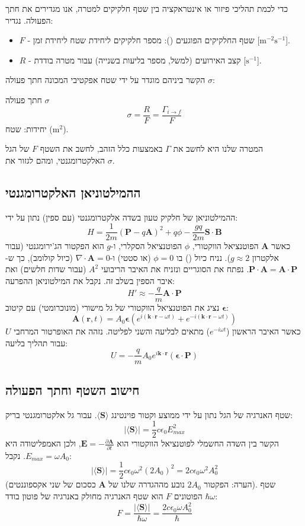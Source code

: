 כדי לכמת תהליכי פיזור או אינטראקציה בין שטף חלקיקים למטרה, אנו מגדירים את חתך הפעולה.
נגדיר:
\begin{itemize}
    \item $F$ - שטף החלקיקים הפוגעים (): מספר חלקיקים ליחידת שטח ליחידת זמן [$\text{m}^{-2}\text{s}^{-1}$].
    \item $R$ - קצב האירועים (למשל, מספר בליעות בשנייה) עבור מטרה בודדת [$\text{s}^{-1}$].
\end{itemize}

הקשר ביניהם מוגדר על ידי שטח אפקטיבי המכונה חתך פעולה $\sigma$:
\begin{definitionbox}{חתך פעולה $\sigma$}
\[
\sigma = \frac{R}{F} = \frac{\Gamma_{i \to f}}{F}
\]
יחידות: שטח ($\text{m}^2$).
\end{definitionbox}
המטרה שלנו היא לחשב את $\Gamma$ באמצעות כלל הזהב, לחשב את השטף $F$ של הגל האלקטרומגנטי, ומהם לגזור את $\sigma$.

\subsection{ההמילטוניאן האלקטרומגנטי}

ההמילטוניאן של חלקיק טעון בשדה אלקטרומגנטי (עם ספין) נתון על ידי:
\[
H = \frac{1}{2m}(\mathbf{P} - q\mathbf{A})^2 + q\phi - \frac{g q}{2m} \mathbf{S} \cdot \mathbf{B}
\]
כאשר $\mathbf{A}$ הפוטנציאל הווקטורי, $\phi$ הפוטנציאל הסקלרי, ו-$g$ הוא הפקטור הג'ירומגנטי (עבור אלקטרון $g \approx 2$).
נניח כיול () בו $\phi=0$ (או סטטי) ו-$\nabla \cdot \mathbf{A} = 0$ (כיול קולומב), כך ש-$\mathbf{P} \cdot \mathbf{A} = \mathbf{A} \cdot \mathbf{P}$. נפתח את הסוגריים ונזניח את האיבר הריבועי $A^2$ (עבור שדות חלשים) ואת איבר הספין בשלב זה. נקבל את המילטוניאן ההפרעה:
\[
H' \approx -\frac{q}{m} \mathbf{A} \cdot \mathbf{P}
\]
נציג את הפוטנציאל הווקטורי של גל מישורי (מונוכרומטי) עם קיטוב $\boldsymbol{\epsilon}$:
\[
\mathbf{A}(\mathbf{r}, t) = A_0 \boldsymbol{\epsilon} \left( e^{i(\mathbf{k}\cdot\mathbf{r} - \omega t)} + e^{-i(\mathbf{k}\cdot\mathbf{r} - \omega t)} \right)
\]
כאשר האיבר הראשון ($e^{-i\omega t}$) מתאים לבליעה והשני לפליטה.
נזהה את האופרטור המרחבי $U$ עבור תהליך בליעה:
\[
U = -\frac{q}{m} A_0 e^{i\mathbf{k}\cdot\mathbf{r}} (\boldsymbol{\epsilon} \cdot \mathbf{P})
\]

\subsection{חישוב השטף וחתך הפעולה}

שטף האנרגיה של הגל נתון על ידי ממוצע וקטור פוינטינג $\langle \mathbf{S} \rangle$. עבור גל אלקטרומגנטי בריק:
\[
|\langle \mathbf{S} \rangle| = \frac{1}{2} c \epsilon_0 E_{max}^2
\]
הקשר בין השדה החשמלי לפוטנציאל הווקטורי הוא $\mathbf{E} = -\frac{\partial \mathbf{A}}{\partial t}$, ולכן האמפליטודה היא $E_{max} = \omega A_0$.
נקבל:
\[
|\langle \mathbf{S} \rangle| = \frac{1}{2} c \epsilon_0 \omega^2 (2A_0)^2 = 2 c \epsilon_0 \omega^2 A_0^2
\]
(הערה: הפקטור $2A_0$ נובע מההגדרה שלנו של $\mathbf{A}$ כסכום של שני אקספוננטים).
שטף הפוטונים $F$ הוא שטף האנרגיה מחולק באנרגיה של פוטון בודד $\hbar\omega$:
\[
F = \frac{|\langle \mathbf{S} \rangle|}{\hbar\omega} = \frac{2 c \epsilon_0 \omega A_0^2}{\hbar}
\]

